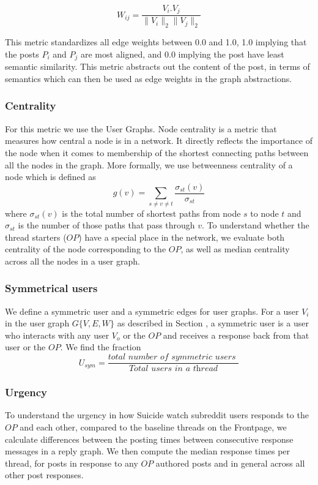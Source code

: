 $$ W_{ij} = \frac{V_i . V_j}{\|V_i\|_2 \|V_j\|_2} $$


This metric standardizes all edge weights between 0.0 and 1.0, 1.0 implying that the posts $P_i$ and $P_j$ are most aligned, and 0.0 implying the post have least semantic similarity. 
This metric abstracts out the content of the post, in terms of semantics which can then be used as edge weights in the graph abstractions.



\subsubsection{Centrality}
\label{Sec:Centrality}
For this metric we use the User Graphs. Node centrality is a metric that measures how central a node is in a network. It directly reflects the importance of the node when it comes to membership of the shortest connecting paths between all the nodes in the graph. More formally, we use betweenness centrality of a node which is defined as 
$$
g(v) = \sum_{s \neq v \neq t}\frac{\sigma_{st}(v)}{\sigma_{st}}
$$
where $\sigma_{st}(v)$ is the total number of shortest paths from node $s$ to node $t$ and $\sigma_{st}$ is the number of those paths that pass through $v$. To understand whether the thread starters ($OP$) have a special place in the network, we evaluate both centrality of the node corresponding to the $OP$, as well as median centrality across all the nodes in a user graph.

\subsubsection{Symmetrical users}
We define a symmetric user and a symmetric edges for user graphs. For a user $V_i$ in the user graph $G\{V,E,W\}$ as described in Section
, a symmetric user is a user who interacts with any user $V_o$ or the $OP$ and receives a response back from that user or the $OP$. We find the fraction 
$$
U_{sym}=\frac{\textit{total number of symmetric users }}{\textit{Total users in a thread}}
$$

\subsubsection{Urgency}
To understand the urgency in how Suicide watch subreddit users responds to the $OP$ and each other, compared to the baseline threads on the Frontpage, we calculate differences between the posting times between consecutive response messages in a reply graph. We then compute the median response times per thread, for posts in response to any $OP$ authored posts and in general across all other post responses. 

